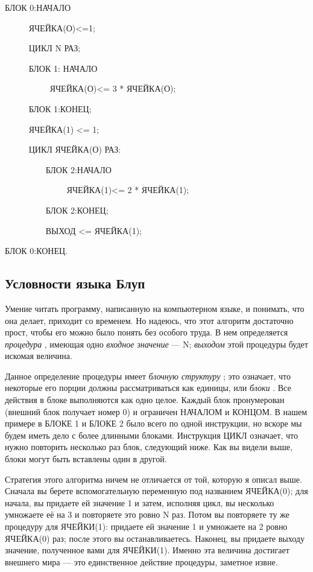 \documentclass[../main.tex]{subfiles}
\begin{document}
БЛОК 0:НАЧАЛО

~~~~~ ЯЧЕЙКА(О)\textless=1;

~~~~~ ЦИКЛ N РАЗ;

~~~~~ БЛОК 1: НАЧАЛО

~~~~~~~~~~ ЯЧЕЙКА(О)\textless= 3 * ЯЧЕЙКА(О);

~~~~~ БЛОК 1:КОНЕЦ;

~~~~~ ЯЧЕЙКА(1) \textless= 1;

~~~~~ ЦИКЛ ЯЧЕЙКА(О) РАЗ:

~~~~~~~~~ БЛОК 2:НАЧАЛО

~~~~~~~~~~~~~~ ЯЧЕЙКА(1)\textless= 2 * ЯЧЕЙКА(1);

~~~~~~~~~ БЛОК 2:КОНЕЦ;

~~~~~~~~~ ВЫХОД \textless= ЯЧЕЙКА(1);

БЛОК 0:КОНЕЦ.


\subsection{Условности языка Блуп}

Умение читать программу, написанную на компьютерном языке, и понимать, что она делает, приходит со временем. Но надеюсь, что этот алгоритм достаточно прост, чтобы его можно было понять без особого труда. В нем определяется \emph{процедура} , имеющая одно \emph{входное значение} --- N; \emph{выходом} этой процедуры будет искомая величина.

Данное определение процедуры имеет \emph{блочную структуру} ; это означает, что некоторые его порции должны рассматриваться как единицы, или \emph{блоки} . Все действия в блоке выполняются как одно целое. Каждый блок пронумерован (внешний блок получает номер 0) и ограничен НАЧАЛОМ и КОНЦОМ\@. В нашем примере в БЛОКЕ 1 и БЛОКЕ 2 было всего по одной инструкции, но вскоре мы будем иметь дело с более длинными блоками. Инструкция ЦИКЛ означает, что нужно повторить несколько раз блок, следующий ниже. Как вы видели выше, блоки могут быть вставлены один в другой.

Стратегия этого алгоритма ничем не отличается от той, которую я описал выше. Сначала вы берете вспомогательную переменную под названием ЯЧЕЙКА(0); для начала, вы придаете ей значение 1 и затем, исполняя цикл, вы несколько умножаете её на 3 и повторяете это ровно N раз. Потом вы повторяете ту же процедуру для ЯЧЕЙКИ(1): придаете ей значение 1 и умножаете на 2 ровно ЯЧЕЙКА(0) раз; после этого вы останавливаетесь. Наконец, вы придаете выходу значение, полученное вами для ЯЧЕЙКИ(1). Именно эта величина достигает внешнего мира --- это единственное действие процедуры, заметное извне.
\end{document}
